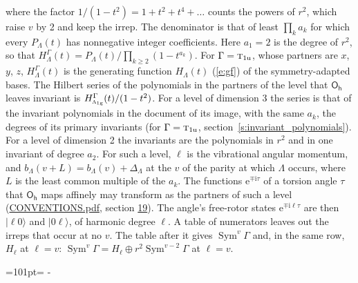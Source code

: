 \documentclass[10pt,a4paper]{article}
\newcommand{\needspace}[1]{\par\penalty-100\begingroup\dimen0=#1\relax\dimen2=\pagegoal
  \advance\dimen2-\pagetotal\ifdim\dimen0>\dimen2\relax\ifdim\dimen2>0pt\vfil\break\fi\fi
  \endgroup}
\numberwithin{equation}{section}
\newcommand{\grp}[1]{\mathsf{#1}}
\newcommand{\irr}[1]{\text{\normalfont\scshape #1}}
\newcommand{\ptag}[1]{\mathrm{#1}}
\newcommand{\iunit}{\mathrm{i}}
\newcommand{\expe}{\mathrm{e}}
\newcommand{\occ}[1]{\lvert #1\rangle}
\begin{document}
where the factor $1/(1 - t^2) = 1 + t^2 + t^4 + \dots$ counts the powers of $r^2$, which raise $v$ by 2 and keep the irrep. The denominator is that of least $\prod_k a_k$ for which every $P_\Lambda(t)$ has nonnegative integer coefficients. Here $a_1 = 2$ is the degree of $r^2$, so that $H^{\Gamma}_\Lambda(t) = P_\Lambda(t)/\prod_{k\ge2}(1 - t^{a_k})$. For $\Gamma = \irr{t}_{1\ptag{u}}$, whose partners are $x$, $y$, $z$, $H^{\Gamma}_\Lambda(t)$ is the generating function $H_\Lambda(t)$ (\ref{e:gf}) of the symmetry-adapted bases. The Hilbert series of the polynomials in the partners of the level that $\grp{O_{h}}$ leaves invariant is $H^{\Gamma}_{\irr{a}_{1\ptag{g}}}(t)/(1 - t^2)$. For a level of dimension 3 the series is that of the invariant polynomials in the document of its image, with the same $a_k$, the degrees of its primary invariants (for $\Gamma = \irr{t}_{1\ptag{u}}$, section~\ref{s:invariant_polynomials}). For a level of dimension 2 the invariants are the polynomials in $r^2$ and in one invariant of degree $a_2$. \label{n:index.overtone.period}\label{n:index.increment.unitary}For such a level, $\ell$ is the vibrational angular momentum, and $b_\Lambda(v + L) = b_\Lambda(v) + \Delta_\Lambda$ at the $v$ of the parity at which $\Lambda$ occurs, where $L$ is the least common multiple of the $a_k$. \label{n:local.torsion.angle}The functions $\expe^{\mp\iunit\tau}$ of a torsion angle $\tau$ that $\grp{O_{h}}$ maps affinely may transform as the partners of such a level (\href{../../CONVENTIONS.pdf}{CONVENTIONS.pdf}, section \href{../../CONVENTIONS.pdf\#conv.19}{19}). The angle's free-rotor states $\expe^{\mp\iunit\ell\tau}$ are then $\occ{\ell 0}$ and $\occ{0 \ell}$, of harmonic degree $\ell$. A table of numerators leaves out the irreps that occur at no $v$. The table after it gives $\operatorname{Sym}^{v}\Gamma$ and, in the same row, $H_\ell$ at $\ell = v$: $\operatorname{Sym}^{v}\Gamma = H_\ell \oplus r^2\operatorname{Sym}^{v-2}\Gamma$ at $\ell = v$.
\needspace{101pt}
\end{document}
